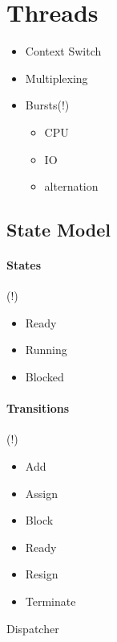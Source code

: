 \documentclass[10pt,a4paper]{article}
\begin{document}
	\section{Threads}
		\begin{itemize}
			\item Context Switch
			\item Multiplexing
			\item Bursts(!)
			\begin{itemize}
				\item CPU
				\item IO
				\item alternation
			\end{itemize}
		\end{itemize}
		\subsection{State Model}
			\paragraph{States}(!)
				\begin{itemize}
					\item Ready
					\item Running
					\item Blocked
				\end{itemize}
			\paragraph{Transitions}(!)
				\begin{itemize}
					\item Add
					\item Assign
					\item Block
					\item Ready
					\item Resign
					\item Terminate
				\end{itemize}
			Dispatcher
\end{document}
